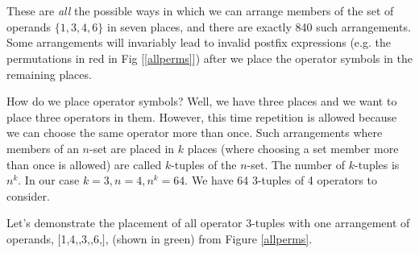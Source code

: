 \documentclass[english,smartquotes]{hgbarticle}
\newenvironment{arrangement}{\captionsetup{type=mytype}}{}
\begin{document}
\begin{arrangement}
\\
\\
\label{allperms}
\end{arrangement}

These are \emph{all} the possible ways in which we can arrange members of the set of operands $\{1,3, 4, 6\}$ in seven places, and there are exactly 840 such arrangements. Some arrangements will invariably lead to invalid postfix expressions (e.g. the permutations in red in Fig [\ref{allperms}]) after we place the operator symbols in the remaining places. 

How do we place operator symbols? Well, we have three places and we want to place three operators in them. However, this time repetition is allowed because we can choose the same operator more than once. Such arrangements where members of an $n$-set are placed in $k$ places (where choosing a set member more than once is allowed) are called $k$-tuples \cite{ktuples} of the $n$-set. The number of $k$-tuples is $n^{k}$. In our case $k=3, n=4, n^k=64$. We have 64 3-tuples of 4 operators to consider.

Let's demonstrate the placement of all operator 3-tuples with one arrangement of operands, $[$1,4,\textvisiblespace,3,\textvisiblespace,6,\textvisiblespace$]$, (shown in green) from Figure \ref{allperms}.
\end{document}
